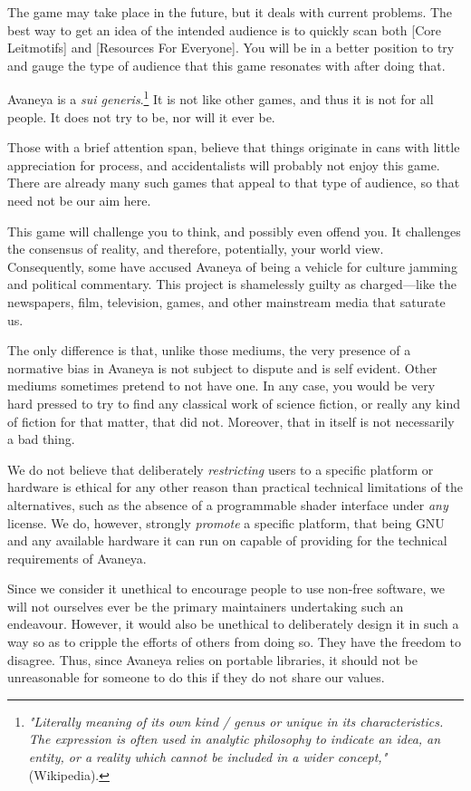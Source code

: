 The game may take place in the future, but it deals with current problems. The best way to get an idea of the intended audience is to quickly scan both [Core Leitmotifs] and [Resources For Everyone]. You will be in a better position to try and gauge the type of audience that this game resonates with after doing that. 

Avaneya is a {\it sui generis}.\footnote{{\it "Literally meaning of its own kind / genus or unique in its characteristics. The expression is often used in analytic philosophy to indicate an idea, an entity, or a reality which cannot be included in a wider concept,"} (Wikipedia).} It is not like other games, and thus it is not for all people. It does not try to be, nor will it ever be.

Those with a brief attention span, believe that things originate in cans with little appreciation for process, and accidentalists will probably not enjoy this game. There are already many such games that appeal to that type of audience, so that need not be our aim here.

This game will challenge you to think, and possibly even offend you. It challenges the consensus of reality, and therefore, potentially, your world view. Consequently, some have accused Avaneya of being a vehicle for culture jamming and political commentary. This project is shamelessly guilty as charged---like the newspapers, film, television, games, and other mainstream media that saturate us. 

The only difference is that, unlike those mediums, the very presence of a normative bias in Avaneya is not subject to dispute and is self evident. Other mediums sometimes pretend to not have one. In any case, you would be very hard pressed to try to find any classical work of science fiction, or really any kind of fiction for that matter, that did not. Moreover, that in itself is not necessarily a bad thing.

We do not believe that deliberately {\it restricting} users to a specific platform or hardware is ethical for any other reason than practical technical limitations of the alternatives, such as the absence of a programmable shader interface under {\it any} license. We do, however, strongly {\it promote} a specific platform, that being GNU and any available hardware it can run on capable of providing for the technical requirements of Avaneya.

Since we consider it unethical to encourage people to use non-free software, we will not ourselves ever be the primary maintainers undertaking such an endeavour. However, it would also be unethical to deliberately design it in such a way so as to cripple the efforts of others from doing so. They have the freedom to disagree. Thus, since Avaneya relies on portable libraries, it should not be unreasonable for someone to do this if they do not share our values.

